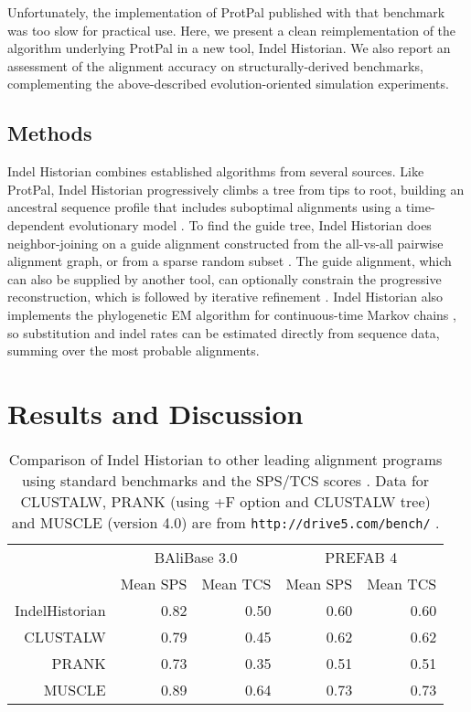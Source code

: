 \documentclass{bioinfo}
\begin{document}
Unfortunately, the implementation of ProtPal published with that benchmark was too slow
for practical use.
Here, we present a clean reimplementation of the algorithm underlying ProtPal
in a new tool, Indel Historian.
We also report an assessment of the alignment accuracy
on structurally-derived benchmarks,
complementing the above-described evolution-oriented simulation experiments.

\begin{methods}
\section{Methods}

Indel Historian combines established algorithms from several sources.
Like ProtPal, Indel Historian progressively climbs a tree from tips to root,
building an ancestral sequence profile that includes suboptimal alignments \citep{LeeGrassoSharlow2002,Westesson2012-zg}
using a time-dependent evolutionary model \citep{RivasEddy2015}.
To find the guide tree, Indel Historian does neighbor-joining %
on a guide alignment constructed from the all-vs-all pairwise alignment graph,
or from a sparse random subset \citep{BradleyEtAl2009}.
The guide alignment, which can also be supplied by another tool,
can optionally constrain the progressive reconstruction,
which is followed by iterative refinement \citep{HolmesBruno2001,Edgar2004b}.
Indel Historian also implements the phylogenetic EM algorithm for continuous-time Markov chains \citep{HolmesRubin2002},
so substitution and indel rates can be estimated directly from sequence data,
summing over the most probable alignments.

\end{methods}

\section{Results and Discussion}

\begin{table}
  \begin{tabular}{r|rr|rr}
    & \multicolumn{2}{c|}{BAliBase 3.0} & \multicolumn{2}{c}{PREFAB 4} \\
    & Mean SPS & Mean TCS & Mean SPS & Mean TCS \\
    \hline
IndelHistorian & 0.82 & 0.50 & 0.60 & 0.60 \\
CLUSTALW & 0.79 & 0.45 & 0.62 & 0.62 \\
PRANK & 0.73 & 0.35 & 0.51 & 0.51 \\
MUSCLE & 0.89 & 0.64 & 0.73 & 0.73 \\
  \end{tabular}
  \caption{
    Comparison of Indel Historian to other leading alignment programs using standard benchmarks
    and the SPS/TCS scores \citep{ThompsonEtAl2005}.
    Data for CLUSTALW, PRANK (using +F option and CLUSTALW tree) and MUSCLE (version 4.0) are from {\tt http://drive5.com/bench/} \citep{Edgar2010}.
  }
\end{table}
\end{document}
